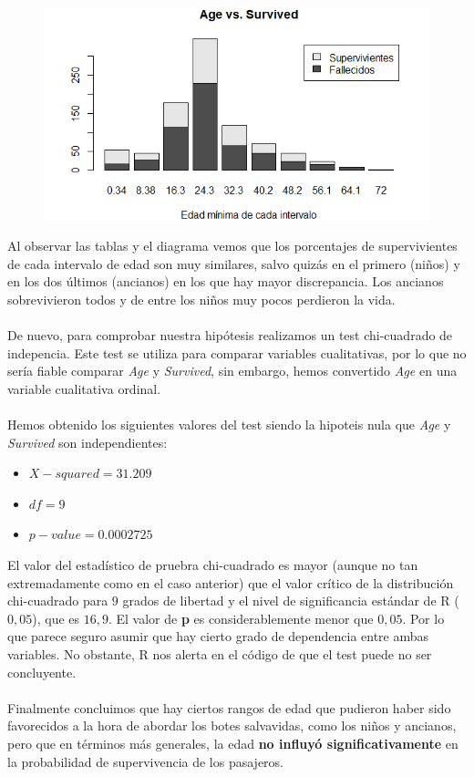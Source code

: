 \documentclass{article}
\begin{document}
\begin{figure}[!h]
    \centering
    \includegraphics[width=0.7\linewidth]{content/age_surv.png}
\end{figure}
\noindent Al observar las tablas y el diagrama vemos que los porcentajes de supervivientes de cada intervalo de edad son muy similares, salvo quizás en el primero (niños) y en los dos últimos (ancianos) en los que hay mayor discrepancia. Los ancianos sobrevivieron todos y de entre los niños muy pocos perdieron la vida.\\\\
De nuevo, para comprobar nuestra hipótesis realizamos un test chi-cuadrado de indepencia. Este test se utiliza para comparar variables cualitativas, por lo que no sería fiable comparar \textit{Age} y \textit{Survived}, sin embargo, hemos convertido \textit{Age} en una variable cualitativa ordinal.\\\\
Hemos obtenido los siguientes valores del test siendo la hipoteis nula que \textit{Age} y \textit{Survived} son independientes:
\begin{itemize}
    \item $X-squared = 31.209$
    \item $df = 9$
    \item $p-value = 0.0002725$
\end{itemize}
\noindent El valor del estadístico de pruebra chi-cuadrado es mayor (aunque no tan extremadamente como en el caso anterior) que el valor crítico de la distribución chi-cuadrado para $9$ grados de libertad y el nivel de significancia estándar de R ($0,05$), que es $16,9$. El valor de \textbf{p} es considerablemente menor que $0,05$. Por lo que parece seguro asumir que hay cierto grado de dependencia entre ambas variables. No obstante, R nos alerta en el código de que el test puede no ser concluyente.\\\\
Finalmente concluimos que hay ciertos rangos de edad que pudieron haber sido favorecidos a la hora de abordar los botes salvavidas, como los niños y ancianos, pero que en términos más generales, la edad \textbf{no influyó significativamente} en la probabilidad de supervivencia de los pasajeros.
\end{document}
